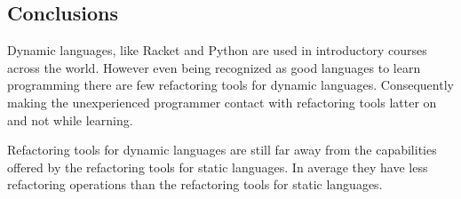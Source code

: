 \subsection{Conclusions}







Dynamic languages, like Racket and Python are used in introductory courses across the world.
However even being recognized as good languages to learn programming there are few refactoring tools for dynamic languages. 
Consequently making the unexperienced programmer contact with refactoring tools latter on and not while learning.

Refactoring tools for dynamic languages are still far away from the capabilities offered by the refactoring tools for static languages. 
In average they have less refactoring operations than the refactoring tools for static languages.

